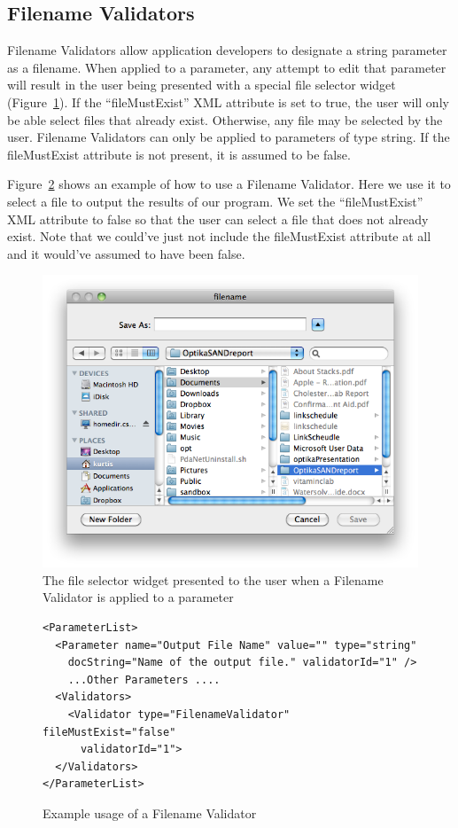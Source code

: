 \subsection{Filename Validators}
Filename Validators allow application developers to designate a string parameter as a filename. When applied to a parameter,
any attempt to edit that parameter will result in the user being presented with a special file selector widget (Figure~\ref{fileSelectorWidget}). If the 
``fileMustExist'' XML attribute is set to true, the user will only be able select files that already exist. Otherwise, any file may be selected by the user.
Filename Validators can only be applied to parameters of type string. If the fileMustExist attribute is not present, it is assumed to be false.

Figure~\ref{filenameValidatorXML} shows an example of how to use a Filename Validator. Here we use it to select a file to output the results
of our program. We set the ``fileMustExist'' XML attribute to false so that the user can select a file that does not already exist. Note that we could've
just not include the fileMustExist attribute at all and it would've assumed to have been false.
\begin{figure}
\centering
\includegraphics[scale=0.5]{graphics/fileWidget}
\caption{The file selector widget presented to the user when a Filename Validator is applied to a parameter}
\label{fileSelectorWidget}
\end{figure}

\begin{figure}
\centering
{\footnotesize
\begin{Verbatim}
<ParameterList>
  <Parameter name="Output File Name" value="" type="string" 
    docString="Name of the output file." validatorId="1" />
    ...Other Parameters ....
  <Validators>
    <Validator type="FilenameValidator" fileMustExist="false" 
      validatorId="1">
  </Validators>
</ParameterList>
\end{Verbatim}
}
\caption{Example usage of a Filename Validator}
\label{filenameValidatorXML}
\end{figure}

